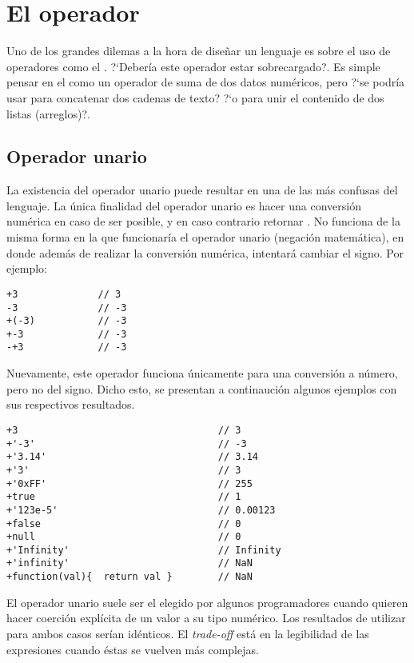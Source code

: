 \section{El operador \code{+}}
\label{sec:operadormas}

Uno de los grandes dilemas a la hora de diseñar un lenguaje es sobre el uso de operadores como el \code{+}. ?`Debería este operador estar sobrecargado?. Es simple pensar en el \code{+} como un operador de suma de dos datos numéricos, pero ?`se podría usar para concatenar dos cadenas de texto? ?`o para unir el contenido de dos listas (arreglos)?.

\subsection{Operador unario}

La existencia del operador unario \code{+} puede resultar en una de las más confusas del lenguaje. La única finalidad del operador unario \code{+} es hacer una conversión numérica en caso de ser posible, y en caso contrario retornar . No funciona de la misma forma en la que funcionaría el operador unario \code{-} (negación matemática), en donde además de realizar la conversión numérica, intentará cambiar el signo. Por ejemplo:

\begin{lstlisting}[title={Operador unario \code{+}}]
+3				// 3
-3				// -3
+(-3)			// -3
+-3				// -3
-+3				// -3
\end{lstlisting}

Nuevamente, este operador funciona únicamente para una conversión a número, pero no del signo. Dicho esto, se presentan a continaución algunos ejemplos con sus respectivos resultados.

\begin{lstlisting}[title={Operador unario \code{+} (más casos)}]
+3                                   // 3
+'-3'                                // -3
+'3.14'                              // 3.14
+'3'                                 // 3
+'0xFF'                              // 255
+true                                // 1
+'123e-5'                            // 0.00123
+false                               // 0
+null                                // 0
+'Infinity'                          // Infinity
+'infinity'                          // NaN
+function(val){  return val }        // NaN
\end{lstlisting}

El operador unario \code{+} suele ser el elegido por algunos programadores cuando quieren hacer coerción explícita de un valor a su tipo numérico. Los resultados de utilizar  para ambos casos serían idénticos. El \textit{trade-off} está en la legibilidad de las expresiones cuando éstas se vuelven más complejas.

